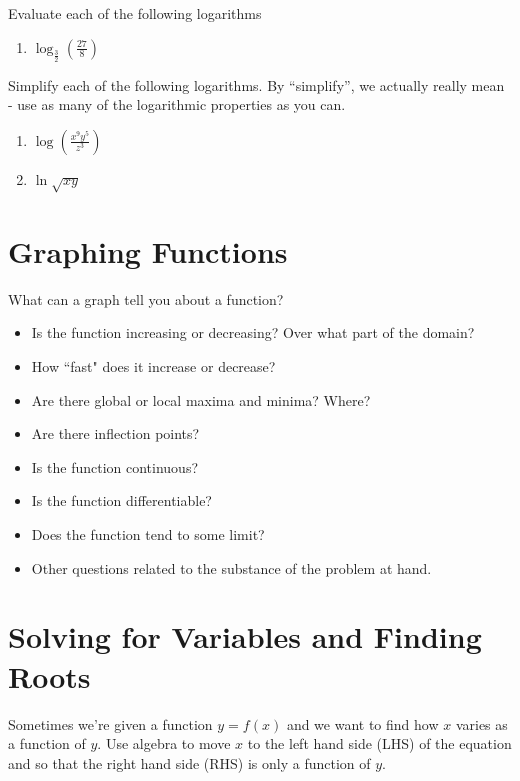 \documentclass[]{book}
\providecommand{\tightlist}{%
  \setlength{\itemsep}{0pt}\setlength{\parskip}{0pt}}
\theoremstyle{definition}
\theoremstyle{definition}
\theoremstyle{definition}
\theoremstyle{remark}
\begin{document}
Evaluate each of the following logarithms

\begin{enumerate}
\def\labelenumi{\arabic{enumi}.}
\tightlist
\item
  \(\log_\frac{3}{2}(\frac{27}{8})\)
\end{enumerate}

Simplify each of the following logarithms. By ``simplify'', we actually
really mean - use as many of the logarithmic properties as you can.

\begin{enumerate}
\def\labelenumi{\arabic{enumi}.}
\setcounter{enumi}{1}
\item
  \(\log(\frac{x^9y^5}{z^3})\)
\item
  \(\ln{\sqrt{xy}}\)
\end{enumerate}

\section{Graphing Functions}\label{graphing-functions}

What can a graph tell you about a function?

\begin{itemize}
\tightlist
\item
  Is the function increasing or decreasing? Over what part of the
  domain?
\item
  How ``fast" does it increase or decrease?
\item
  Are there global or local maxima and minima? Where?
\item
  Are there inflection points?
\item
  Is the function continuous?
\item
  Is the function differentiable?
\item
  Does the function tend to some limit?
\item
  Other questions related to the substance of the problem at hand.
\end{itemize}

\section{Solving for Variables and Finding
Roots}\label{solving-for-variables-and-finding-roots}

Sometimes we're given a function \(y=f(x)\) and we want to find how
\(x\) varies as a function of \(y\). Use algebra to move \(x\) to the
left hand side (LHS) of the equation and so that the right hand side
(RHS) is only a function of \(y\).
\end{document}
